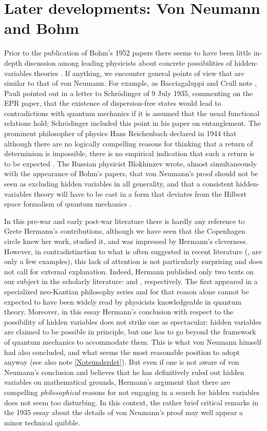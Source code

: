 \documentclass[12pt]{article}
\begin{document}
\section{Later developments: Von Neumann and Bohm}\label{later}

Prior to the publication of Bohm's 1952 papers there seems to have been little in-depth discussion among leading physicists about concrete possibilities of hidden-variables theories \cite[pp.\@ 275--278]{jammer}. If anything, we encounter general points of view that are similar to that of von Neumann. For example, as Bacciagaluppi and Crull note \cite[p.\@ 139]{crull}, Pauli pointed out in a letter to Schr\"{o}dinger of 9 July 1935, commenting on the EPR paper, that the existence of dispersion-free states would lead to contradictions with quantum mechanics if it is assumed that the usual functional relations hold; Schr\"{o}dinger included this point in his paper on entanglement. The prominent philosopher of physics Hans Reichenbach declared in 1944 that although there are no logically compelling reasons for thinking that a return of determinism is impossible, there is no empirical indication that such a return is to be expected \cite[p.\@ 276]{jammer}. The Russian physicist Blokhinzev wrote, almost simultaneously with the appearance of Bohm's papers, that von Neumann's proof should not be seen as excluding hidden variables in all generality, and that a consistent hidden-variables theory will have to be cast in a form that deviates from the Hilbert space formalism of quantum mechanics \cite[p.\@ 277]{jammer}.

In this pre-war and early post-war literature there is hardly any reference to Grete Hermann's contributions, although we have seen that the Copenhagen circle knew her work, studied it, and was impressed by Hermann's cleverness. However, in contradistinction to what is often suggested in recent literature (\cite{mermin,seevinck}, \cite[pp.\@ 13--18]{herzenberg} are only a few examples), this lack of attention is not particularly surprising and does not call for external explanation. Indeed, Hermann published only two texts on our subject in the scholarly literature: \cite{hermann1} and \cite{hermann2}, respectively. The first appeared in a specialized neo-Kantian philosophy series and for that reason alone cannot be expected to have been widely read by physicists knowledgeable in quantum theory. Moreover, in this essay Hermann's conclusion with respect to the possibility of hidden variables does not strike one as spectacular: hidden variables are claimed to be possible in principle, but one has to go beyond the framework of quantum mechanics to accommodate them. This is what von Neumann himself had also concluded, and what seems the most reasonable position to adopt anyway (see also note \ref{Noteunderdet}). But even if one is not aware of von Neumann's conclusion and believes that he has definitively ruled out hidden variables on mathematical grounds, Hermann's argument that there are compelling \emph{philosophical} reasons for not engaging in a search for hidden variables does not seem too disturbing. In this context, the rather brief critical remarks in the 1935 essay about the details of von Neumann's proof may well appear a minor technical quibble.
\end{document}
